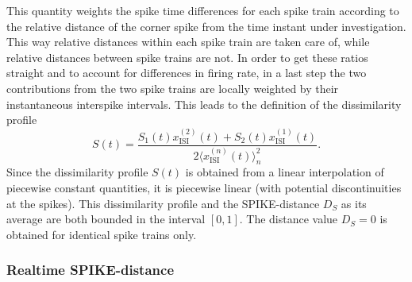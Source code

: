 \documentclass[10pt,twocolumn]{elsart5p}
\begin{document}
This quantity weights the spike time differences for each spike train according to the relative distance of the corner spike from the time instant under investigation. This way relative distances within each spike train are taken care of, while relative distances between spike trains are not. In order to get these ratios straight and to account for differences in firing rate, in a last step the two contributions from the two spike trains are locally weighted by their instantaneous interspike intervals. This leads to the definition of the dissimilarity profile
%
\begin{equation} \label{eq:Bi-Spike-Diss-Improved}
     S (t) = \frac{S_1 (t) x_{\mathrm {ISI}}^{(2)} (t) + S_2 (t) x_{\mathrm {ISI}}^{(1)} (t)}{2 \langle x_{\mathrm {ISI}}^{(n)} (t) \rangle_n^2}.
\end{equation}
%
Since the dissimilarity profile $S (t)$ is obtained from a linear interpolation of piecewise constant quantities, it is piecewise linear (with potential discontinuities at the spikes). This dissimilarity profile and the SPIKE-distance $D_S$ as its average are both bounded in the interval $[0, 1]$. The distance value $D_S = 0$ is obtained for identical spike trains only.



\subsubsection{\label{sss:Realtime-Spike-Distance} Realtime SPIKE-distance}
\end{document}
